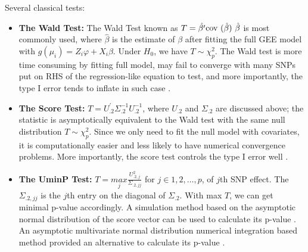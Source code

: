 \documentclass[compress]{beamer}
\begin{document}
{\framebreak
\scriptsize
Several classical tests:
\begin{itemize}
\item \textbf{The Wald Test:} The Wald Test known as $T=\hat{\beta'}\text{cov (\ensuremath{\hat{\beta}}) }\hat{\beta}$ is most commonly used, where $\hat{\beta}$ is the estimate of $\beta$ after fitting the full GEE model with $g(\mu_i) = Z_i\varphi + X_i \beta$. Under $H_0$, we have $T \sim \chi_{p}^2$. The Wald test is more time consuming by fitting full model, may fail to converge with many SNPs put on RHS of the regression-like equation to test, and more importantly, the type I error tends to inflate in such case \cite{pan2014powerful,zhang2014testing}.
\item \textbf{The Score Test:} $T=U_{.2}^{'}\Sigma_{.2}^{-1}U_{.2}^{-1}$, where $U_{.2}$ and $\Sigma_{.2}$ are discussed above; the statistic is asymptotically equivalent to the Wald test with the same null distribution $T \sim \chi_{p}^2$. Since we only need to fit the null model with covariates, it is computationally easier and less likely to have numerical convergence
problems. More importantly, the score test controls the type I error well \cite{pan2014powerful,zhang2014testing}.
\item \textbf{The UminP Test: }$T=\underset{j}{max}\frac{U_{.2,j}^{2}}{\Sigma_{.2,jj}}$
for $j\in 1,2,\dots,p$, of $j$th SNP effect. The $\Sigma_{.2,jj}$ is the $j$th entry on the diagonal of $\Sigma_{.2}$. With max $T$, we can get minimal p-value accordingly.
A simulation method based on the asymptotic normal distribution of
the score vector can be used to calculate its p-value \cite{pan2014powerful,zhang2014testing}. An asymptotic multivariate normal distribution numerical integration based method provided an alternative to calculate its p-value \cite{Pan2009a,Pan2009}. %

\end{itemize}
}
\end{document}

